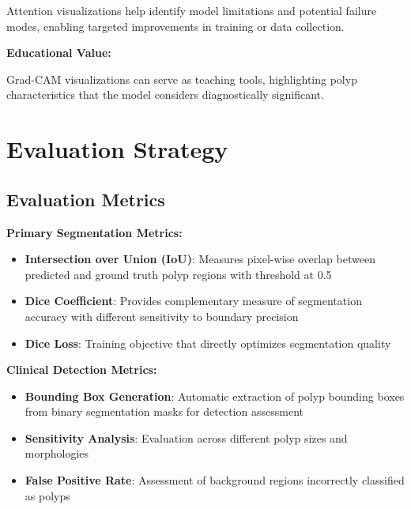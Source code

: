 \documentclass[a4paper,12pt]{report}
\begin{document}
Attention visualizations help identify model limitations and potential failure modes, enabling targeted improvements in training or data collection.

\vspace{1em}

\noindent\textbf{\normalsize Educational Value:}
\vspace{0.5em}

Grad-CAM visualizations can serve as teaching tools, highlighting polyp characteristics that the model considers diagnostically significant.

\section{Evaluation Strategy}

\subsection{Evaluation Metrics}

\noindent\textbf{\normalsize Primary Segmentation Metrics:}
\vspace{0.5em}

\begin{itemize}
    \item \textbf{Intersection over Union (IoU)}: Measures pixel-wise overlap between predicted and ground truth polyp regions with threshold at 0.5
    \item \textbf{Dice Coefficient}: Provides complementary measure of segmentation accuracy with different sensitivity to boundary precision
    \item \textbf{Dice Loss}: Training objective that directly optimizes segmentation quality
\end{itemize}

\vspace{1em}

\noindent\textbf{\normalsize Clinical Detection Metrics:}
\vspace{0.5em}

\begin{itemize}
    \item \textbf{Bounding Box Generation}: Automatic extraction of polyp bounding boxes from binary segmentation masks for detection assessment
    \item \textbf{Sensitivity Analysis}: Evaluation across different polyp sizes and morphologies
    \item \textbf{False Positive Rate}: Assessment of background regions incorrectly classified as polyps
\end{itemize}
\end{document}
